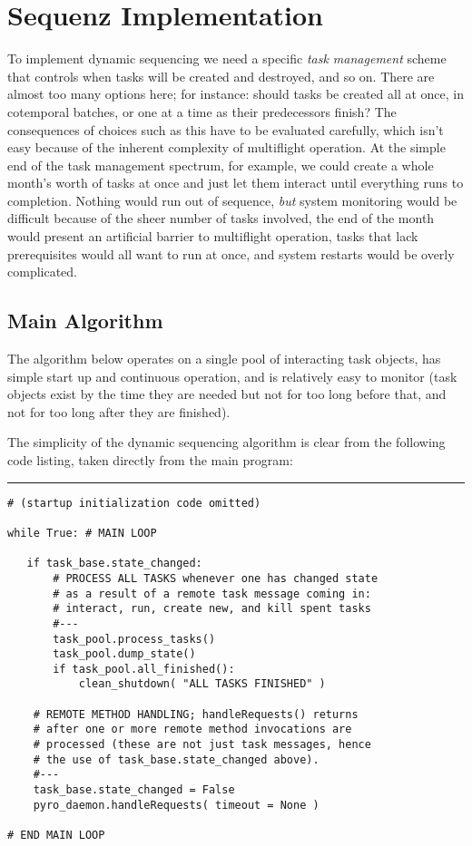 \documentclass[11pt,a4paper]{article}
\begin{document}
\section{Sequenz Implementation}

To implement dynamic sequencing we need a specific {\em task management}
scheme that controls when tasks will be created and destroyed, and so
on. There are almost too many options here; for instance: should tasks
be created all at once, in cotemporal batches, or one at a time as their
predecessors finish? The consequences of choices such as this have to
be evaluated carefully, which isn't easy because of the inherent
complexity of multiflight operation. At the simple end of the task
management spectrum, for example, we could create a whole month's worth
of tasks at once and just let them interact until everything runs to
completion. Nothing would run out of sequence, {\em but} system
monitoring would be difficult because of the sheer number of tasks
involved, the end of the month would present an artificial barrier to
multiflight operation, tasks that lack prerequisites would all want to
run at once, and system restarts would be overly complicated. 

\subsection{Main Algorithm}

The algorithm below operates on a single pool of interacting task
objects, has simple start up and continuous operation, and is relatively
easy to monitor (task objects exist by the time they are needed but not
for too long before that, and not for too long after they are finished). 

The simplicity of the dynamic sequencing algorithm is clear from the
following code listing, taken directly from the main program:

{\small
\noindent
\rule{5cm}{.2mm}
\begin{lstlisting}
# (startup initialization code omitted)

while True: # MAIN LOOP

   if task_base.state_changed:
       # PROCESS ALL TASKS whenever one has changed state
       # as a result of a remote task message coming in: 
       # interact, run, create new, and kill spent tasks
       #---
       task_pool.process_tasks()
       task_pool.dump_state()
       if task_pool.all_finished():
           clean_shutdown( "ALL TASKS FINISHED" )

    # REMOTE METHOD HANDLING; handleRequests() returns 
    # after one or more remote method invocations are 
    # processed (these are not just task messages, hence 
    # the use of task_base.state_changed above).
    #---
    task_base.state_changed = False
    pyro_daemon.handleRequests( timeout = None )

# END MAIN LOOP
\end{lstlisting}
}
\end{document}
